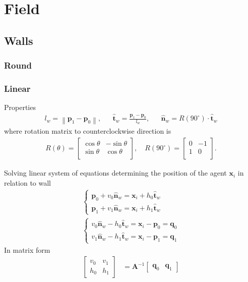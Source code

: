 \section{Field}
\subsection{Walls}
\subsubsection{Round}

\subsubsection{Linear}
Properties
\begin{align}
l_{w} = \left\|\mathbf{p}_{1} - \mathbf{p}_{0}\right\|, && \hat{\mathbf{t}}_{w} = \frac{\mathbf{p}_{1} - \mathbf{p}_{0}}{l_{w}}, && \hat{\mathbf{n}}_{w} = R(90^{\circ}) \cdot \hat{\mathbf{t}}_{w}
\end{align}
where rotation matrix to counterclockwise direction is
\begin{align}
R(\theta) = \begin{bmatrix}\cos \theta & -\sin \theta \\\sin \theta & \cos \theta \\\end{bmatrix}, \quad R(90^{\circ}) = \begin{bmatrix}0 & -1 \\ 1 & 0 \\\end{bmatrix}.
\end{align}

Solving linear system of equations determining the position of the agent $ \mathbf{x}_{i} $ in relation to wall
\begin{align}
\begin{cases}
\mathbf{p}_{0} + v_{0} \hat{\mathbf{n}}_{w} = \mathbf{x}_{i} + h_{0} \hat{\mathbf{t}}_{w} \\
\mathbf{p}_{1} + v_{1} \hat{\mathbf{n}}_{w} = \mathbf{x}_{i} + h_{1} \hat{\mathbf{t}}_{w}
\end{cases} 
\\
\begin{cases}
v_{0} \hat{\mathbf{n}}_{w} - h_{0} \hat{\mathbf{t}}_{w} = \mathbf{x}_{i} - \mathbf{p}_{0} =  \mathbf{q}_{0} \\
v_{1} \hat{\mathbf{n}}_{w} - h_{1} \hat{\mathbf{t}}_{w} = \mathbf{x}_{i} - \mathbf{p}_{1} = \mathbf{q}_{1}
\end{cases}
\end{align}
In matrix form
\begin{align}
\begin{bmatrix} v_{0} & v_{1} \\ h_{0} & h_{1} \end{bmatrix} &= \mathbf{A}^{-1} \begin{bmatrix} \mathbf{q}_{0} & \mathbf{q}_{1} \end{bmatrix}
\end{align}


